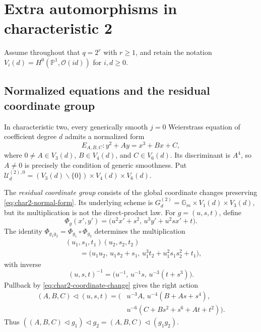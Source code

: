 \documentclass[a4paper,12pt]{amsart}
\theoremstyle{definition}
\newcommand{\cU}{\mathcal{U}}
\newcommand{\Pb}{\mathbb{P}}
\newcommand{\Gb}{\mathbb{G}}
\renewcommand{\setminus}{\smallsetminus}
\begin{document}
\section{Extra automorphisms in characteristic 2}
\label{sec:char2-fixed}

Assume throughout that $q=2^r$ with $r\geq1$, and retain the notation $V_i(d)=H^0(\Pb^1,\mathcal O(id))$ for $i,d\geq0$.

\subsection{Normalized equations and the residual coordinate group}

In characteristic two, every generically smooth $j=0$ Weierstrass equation of coefficient degree $d$ admits a normalized form
\begin{equation}\label{eq:char2-normal-form}
E_{A,B,C}\colon y^2+Ay=x^3+Bx+C,
\end{equation}
where $0\neq A\in V_3(d)$, $B\in V_4(d)$, and $C\in V_6(d)$.  Its discriminant is $A^4$, so $A\neq0$ is precisely the condition of generic smoothness.  Put $\cU_d^{(2),0}=(V_3(d)\setminus\{0\})\times V_4(d)\times V_6(d)$.

The \emph{residual coordinate group} consists of the global coordinate changes preserving \eqref{eq:char2-normal-form}.  Its underlying scheme is $G_d^{(2)}=\Gb_m\times V_1(d)\times V_3(d)$, but its multiplication is not the direct-product law.  For $g=(u,s,t)$, define
\begin{equation}\label{eq:char2-coordinate-change}
\Phi_g(x',y')
=
\bigl(u^2x'+s^2,\,u^3y'+u^2sx'+t\bigr).
\end{equation}
The identity $\Phi_{g_1g_2}=\Phi_{g_1}\circ\Phi_{g_2}$ determines the multiplication
\begin{equation}\label{eq:char2-group-law}
\begin{aligned}
&(u_1,s_1,t_1)(u_2,s_2,t_2)\\
&\qquad=
\bigl(u_1u_2,\,u_1s_2+s_1,\,u_1^3t_2+u_1^2s_1s_2^2+t_1\bigr),
\end{aligned}
\end{equation}
with inverse
\begin{equation}\label{eq:char2-group-inverse}
(u,s,t)^{-1}
=
\bigl(u^{-1},\,u^{-1}s,\,u^{-3}(t+s^3)\bigr).
\end{equation}
Pullback by \eqref{eq:char2-coordinate-change} gives the right action
\begin{equation}\label{eq:char2-coefficient-action}
\begin{aligned}
(A,B,C)\mathbin{\triangleleft}(u,s,t)
=
\bigl(&u^{-3}A,\,u^{-4}(B+As+s^4),\\
&u^{-6}(C+Bs^2+s^6+At+t^2)\bigr).
\end{aligned}
\end{equation}
Thus $((A,B,C)\mathbin{\triangleleft}g_1)\mathbin{\triangleleft}g_2=(A,B,C)\mathbin{\triangleleft}(g_1g_2)$.
\end{document}
